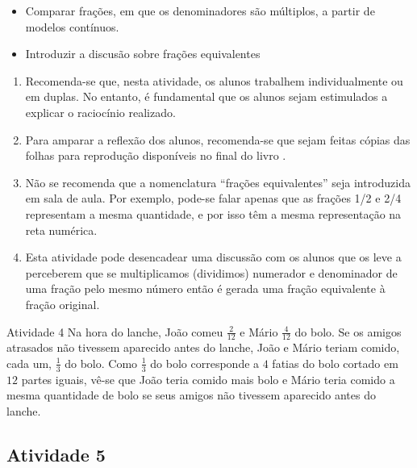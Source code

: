 \documentclass[oneside]{book}
\begin{document}
\begin{multicols}{2}
\begin{itemize} %
    \item       Comparar frações, em que os denominadores são múltiplos, a 
partir de modelos contínuos.
    \item       Introduzir a discusão sobre frações equivalentes    
\end{itemize} %
  
      
 
\begin{enumerate} [\quad a)] %
    \item       Recomenda-se que, nesta atividade, os alunos trabalhem 
individualmente ou em duplas. No entanto, é fundamental que os alunos sejam 
estimulados a explicar o raciocínio realizado.
    \item       Para amparar a reflexão dos alunos, recomenda-se que sejam 
feitas cópias das             folhas para reprodução disponíveis no final do 
livro      .
    \item       Não se recomenda que a nomenclatura       ``frações 
equivalentes''       seja introduzida em sala de aula. Por exemplo, pode-se 
falar apenas que as frações 1/2 e 2/4 representam a mesma quantidade, e por isso 
têm a mesma representação na reta numérica.
    \item       Esta atividade pode desencadear uma discussão com os alunos que 
os leve a perceberem que se multiplicamos (dividimos) numerador e denominador de 
uma fração pelo mesmo número então é gerada uma fração equivalente à fração 
original.
\end{enumerate} %
  
\begin{resposta*}{Atividade 4}  
  Na hora do lanche, João comeu   $\frac{2}{12}$   e Mário   $\frac{4}{12}$   do 
bolo. Se os amigos atrasados não tivessem aparecido antes do lanche, João e 
Mário teriam comido, cada um,   $\frac{1}{3}$   do bolo. Como   $\frac{1}{3}$   
do bolo corresponde a   $4$   fatias do bolo cortado em   $12$   partes iguais, 
vê-se que João teria comido mais bolo e Mário teria comido a mesma quantidade de 
bolo se seus amigos não tivessem aparecido antes do lanche.  
\end{resposta*}




\subsection{Atividade 5}


\end{multicols}
\end{document}
